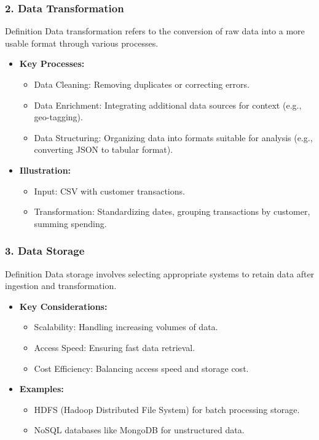 \documentclass[aspectratio=169]{beamer}
\begin{document}
\begin{frame}[fragile]
    \frametitle{2. Data Transformation}
    \begin{block}{Definition}
        Data transformation refers to the conversion of raw data into a more usable format through various processes.
    \end{block}
    \begin{itemize}
        \item \textbf{Key Processes:}
        \begin{itemize}
            \item Data Cleaning: Removing duplicates or correcting errors.
            \item Data Enrichment: Integrating additional data sources for context (e.g., geo-tagging).
            \item Data Structuring: Organizing data into formats suitable for analysis (e.g., converting JSON to tabular format).
        \end{itemize}
        \item \textbf{Illustration:}
        \begin{itemize}
            \item Input: CSV with customer transactions.
            \item Transformation: Standardizing dates, grouping transactions by customer, summing spending.
        \end{itemize}
    \end{itemize}
\end{frame}

\begin{frame}[fragile]
    \frametitle{3. Data Storage}
    \begin{block}{Definition}
        Data storage involves selecting appropriate systems to retain data after ingestion and transformation.
    \end{block}
    \begin{itemize}
        \item \textbf{Key Considerations:}
        \begin{itemize}
            \item Scalability: Handling increasing volumes of data.
            \item Access Speed: Ensuring fast data retrieval.
            \item Cost Efficiency: Balancing access speed and storage cost.
        \end{itemize}
        \item \textbf{Examples:}
        \begin{itemize}
            \item HDFS (Hadoop Distributed File System) for batch processing storage.
            \item NoSQL databases like MongoDB for unstructured data.
        \end{itemize}
    \end{itemize}
\end{frame}
\end{document}
